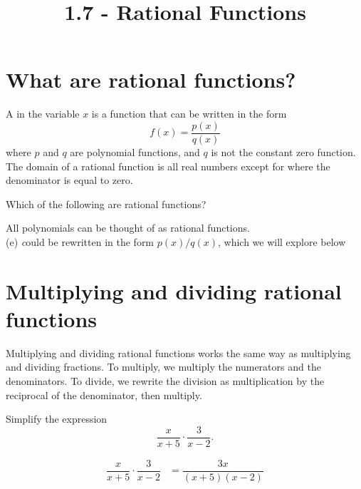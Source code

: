 \documentclass{ximera}
\title{1.7 - Rational Functions}
\begin{document}
\begin{abstract} \end{abstract}
\maketitle



\section{What are rational functions?}
\begin{definition}
  A  in the variable $x$ is a function that can be written in the form
  \[
  f(x) = \frac{p(x)}{q(x)}
  \]
  where $p$ and $q$ are polynomial functions, and $q$ is not the constant zero function. The domain of a rational
  function is all real numbers except for where the denominator is
  equal to zero.
\end{definition}


\begin{question}
  Which of the following are rational functions?
  \begin{selectAll}
  \end{selectAll}
  \begin{feedback}
    All polynomials can be thought of as rational functions.
    \\(e) \emph could be rewritten in the form $p(x)/q(x)$, which we will explore below
  \end{feedback}
\end{question}

\section{Multiplying and dividing rational functions}

Multiplying and dividing rational functions works the same way as multiplying and dividing fractions. To multiply, we multiply the numerators and the denominators. To divide, we rewrite the division as multiplication by the reciprocal of the denominator, then multiply.

\begin{example}
	Simplify the expression \[ \dfrac{x}{x+5}\cdot\dfrac{3}{x-2}. \]
	\begin{explanation}
		\begin{align*}
			\dfrac{x}{x+5}\cdot\dfrac{3}{x-2} &= \dfrac{3x}{(x+5)(x-2)}\\
		\end{align*}
	\end{explanation}
\end{example}
\end{document}
